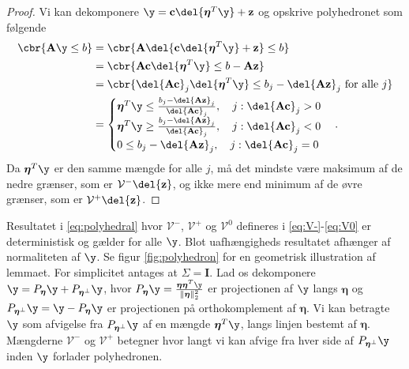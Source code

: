 \begin{proof}
Vi kan dekomponere \(\y = \mathbf{c} \del{\boldsymbol{\eta}^T \y} + \mathbf{z}\) og opskrive polyhedronet som følgende
\begin{align*}
\cbr{\mathbf{A} \y \leq b} &= \cbr{\mathbf{A} \del{\mathbf{c} \del{\boldsymbol{\eta}^T \y} + \mathbf{z}} \leq b} \\
&= \cbr{\mathbf{A} \mathbf{c} \del{\boldsymbol{\eta}^T \y} \leq b - \mathbf{A} \mathbf{z} } \\
&= \cbr{\del{\mathbf{A} \mathbf{c}}_j \del{\boldsymbol{\eta}^T \y} \leq b_j - \del{\mathbf{A} \mathbf{z}}_j \text{ for alle } j} \\
&= \begin{cases}
\boldsymbol{\eta}^T \y \leq \frac{b_j - \del{\mathbf{A} \mathbf{z}}_j}{\del{\mathbf{A} \mathbf{c}}_j}, \quad j:\del{\mathbf{A} \mathbf{c}}_j > 0 \\
\boldsymbol{\eta}^T \y \geq \frac{b_j - \del{\mathbf{A} \mathbf{z}}_j}{\del{\mathbf{A} \mathbf{c}}_j}, \quad j:\del{\mathbf{A} \mathbf{c}}_j < 0 \\
0 \leq b_j - \del{\mathbf{A} \mathbf{z}}_j, \quad j:\del{\mathbf{A} \mathbf{c}}_j = 0
\end{cases}.
\end{align*}
Da \(\boldsymbol{\eta}^T \y \) er den samme mængde for alle \(j\), må det mindste være maksimum af de nedre grænser, som er \(\mathcal{V}^- \del{\mathbf{z}}\), og ikke mere end minimum af de øvre grænser, som er \(\mathcal{V}^+ \del{\mathbf{z}}\).
\end{proof}
Resultatet i \eqref{eq:polyhedral} hvor \(\mathcal{V}^-\), \(\mathcal{V}^+\) og \(\mathcal{V}^0\) defineres i \eqref{eq:V-}-\eqref{eq:V0} er deterministisk og gælder for alle \(\y\).
Blot uafhængigheds resultatet afhænger af normaliteten af \(\y\).
Se figur \ref{fig:polyhedron} for en geometrisk illustration af lemmaet.
For simplicitet antages at \(\Sigma= \mathbf{I}\).
Lad os dekomponere \(\y=P_{\boldsymbol{\eta}} \y + P_{\boldsymbol{\eta}^\perp} \y\), hvor \(P_{\boldsymbol{\eta}} \y = \frac{\boldsymbol{\eta} \boldsymbol{\eta}^T \y}{\Vert \boldsymbol{\eta} \Vert_2^2}\) er projectionen af \(\y\) langs \(\boldsymbol{\eta}\) og  \(P_{\boldsymbol{\eta}^\perp} \y = \y - P_{\boldsymbol{\eta}} \y\) er projectionen på orthokomplement af \(\boldsymbol{\eta}\).
Vi kan betragte \(\y\) som afvigelse fra \(P_{\boldsymbol{\eta}^\perp} \y\) af en mængde \(\boldsymbol{\eta}^T \y\), langs linjen bestemt af \(\boldsymbol{\eta}\).
Mængderne \(\mathcal{V}^-\) og \(\mathcal{V}^+\) betegner hvor langt vi kan afvige fra hver side af \(P_{\boldsymbol{\eta}^\perp} \y\) inden \(\y\) forlader polyhedronen.

